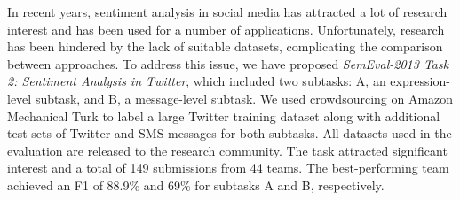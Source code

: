 
In recent years, sentiment analysis in social media has attracted a lot of research interest and has been used for a number of applications. Unfortunately, research has been hindered by the lack of suitable datasets, complicating the comparison between approaches. To address this issue, we have proposed \emph{SemEval-2013 Task 2: Sentiment Analysis in Twitter},
which included two subtasks: A, an expression-level subtask, and B, a message-level subtask. We used crowdsourcing on Amazon Mechanical Turk to label a large Twitter training dataset along with additional test sets of Twitter and SMS messages for both subtasks. All datasets used in the evaluation are released to the research community.
The task attracted significant interest and a total of 149 submissions from 44 teams. The best-performing team achieved an F1 of 88.9\% and 69\% for subtasks A and B, respectively.


